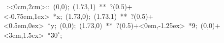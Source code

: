 \hbox{
\xy    <2cm,0cm>:<0cm,2cm>::
       (0,0); (1.73,1) **\dir{-}  ?(0.5)+<-0.75em,1ex> *{x};
       (1.73,0); (1.73,1) **\dir{-}  ?(0.5)+<0.5em,0ex> *{y};
       (0,0); (1.73,0) **\dir{-}    ?(0.5)+<0em,-1.25ex> *{9};
	   (0,0)+<3em,1.5ex> *{\hbox{$30^{\circ}$}};
       \endxy}
